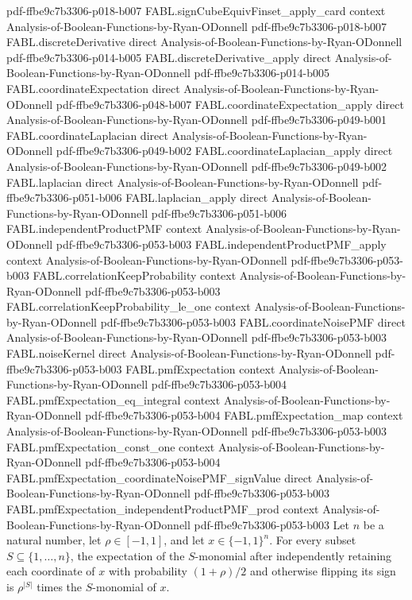 \begin{theorem}
  {pdf-ffbe9c7b3306-p018-b007}
\proofstep
  {FABL.signCubeEquivFinset_apply_card}
  {context}
  {Analysis-of-Boolean-Functions-by-Ryan-ODonnell}
  {pdf-ffbe9c7b3306-p018-b007}
\proofstep
  {FABL.discreteDerivative}
  {direct}
  {Analysis-of-Boolean-Functions-by-Ryan-ODonnell}
  {pdf-ffbe9c7b3306-p014-b005}
\proofstep
  {FABL.discreteDerivative_apply}
  {direct}
  {Analysis-of-Boolean-Functions-by-Ryan-ODonnell}
  {pdf-ffbe9c7b3306-p014-b005}
\proofstep
  {FABL.coordinateExpectation}
  {direct}
  {Analysis-of-Boolean-Functions-by-Ryan-ODonnell}
  {pdf-ffbe9c7b3306-p048-b007}
\proofstep
  {FABL.coordinateExpectation_apply}
  {direct}
  {Analysis-of-Boolean-Functions-by-Ryan-ODonnell}
  {pdf-ffbe9c7b3306-p049-b001}
\proofstep
  {FABL.coordinateLaplacian}
  {direct}
  {Analysis-of-Boolean-Functions-by-Ryan-ODonnell}
  {pdf-ffbe9c7b3306-p049-b002}
\proofstep
  {FABL.coordinateLaplacian_apply}
  {direct}
  {Analysis-of-Boolean-Functions-by-Ryan-ODonnell}
  {pdf-ffbe9c7b3306-p049-b002}
\proofstep
  {FABL.laplacian}
  {direct}
  {Analysis-of-Boolean-Functions-by-Ryan-ODonnell}
  {pdf-ffbe9c7b3306-p051-b006}
\proofstep
  {FABL.laplacian_apply}
  {direct}
  {Analysis-of-Boolean-Functions-by-Ryan-ODonnell}
  {pdf-ffbe9c7b3306-p051-b006}
\proofstep
  {FABL.independentProductPMF}
  {context}
  {Analysis-of-Boolean-Functions-by-Ryan-ODonnell}
  {pdf-ffbe9c7b3306-p053-b003}
\proofstep
  {FABL.independentProductPMF_apply}
  {context}
  {Analysis-of-Boolean-Functions-by-Ryan-ODonnell}
  {pdf-ffbe9c7b3306-p053-b003}
\proofstep
  {FABL.correlationKeepProbability}
  {context}
  {Analysis-of-Boolean-Functions-by-Ryan-ODonnell}
  {pdf-ffbe9c7b3306-p053-b003}
\proofstep
  {FABL.correlationKeepProbability_le_one}
  {context}
  {Analysis-of-Boolean-Functions-by-Ryan-ODonnell}
  {pdf-ffbe9c7b3306-p053-b003}
\proofstep
  {FABL.coordinateNoisePMF}
  {direct}
  {Analysis-of-Boolean-Functions-by-Ryan-ODonnell}
  {pdf-ffbe9c7b3306-p053-b003}
\proofstep
  {FABL.noiseKernel}
  {direct}
  {Analysis-of-Boolean-Functions-by-Ryan-ODonnell}
  {pdf-ffbe9c7b3306-p053-b003}
\proofstep
  {FABL.pmfExpectation}
  {context}
  {Analysis-of-Boolean-Functions-by-Ryan-ODonnell}
  {pdf-ffbe9c7b3306-p053-b004}
\proofstep
  {FABL.pmfExpectation_eq_integral}
  {context}
  {Analysis-of-Boolean-Functions-by-Ryan-ODonnell}
  {pdf-ffbe9c7b3306-p053-b004}
\proofstep
  {FABL.pmfExpectation_map}
  {context}
  {Analysis-of-Boolean-Functions-by-Ryan-ODonnell}
  {pdf-ffbe9c7b3306-p053-b003}
\proofstep
  {FABL.pmfExpectation_const_one}
  {context}
  {Analysis-of-Boolean-Functions-by-Ryan-ODonnell}
  {pdf-ffbe9c7b3306-p053-b004}
\proofstep
  {FABL.pmfExpectation_coordinateNoisePMF_signValue}
  {direct}
  {Analysis-of-Boolean-Functions-by-Ryan-ODonnell}
  {pdf-ffbe9c7b3306-p053-b003}
\proofstep
  {FABL.pmfExpectation_independentProductPMF_prod}
  {context}
  {Analysis-of-Boolean-Functions-by-Ryan-ODonnell}
  {pdf-ffbe9c7b3306-p053-b003}
Let $n$ be a natural number, let $\rho\in[-1,1]$, and let $x\in\{-1,1\}^n$. For every
subset $S\subseteq\{1,\ldots,n\}$, the expectation of the $S$-monomial after
independently retaining each coordinate of $x$ with probability $(1+\rho)/2$ and
otherwise flipping its sign is $\rho^{|S|}$ times the $S$-monomial of $x$.
\end{theorem}

